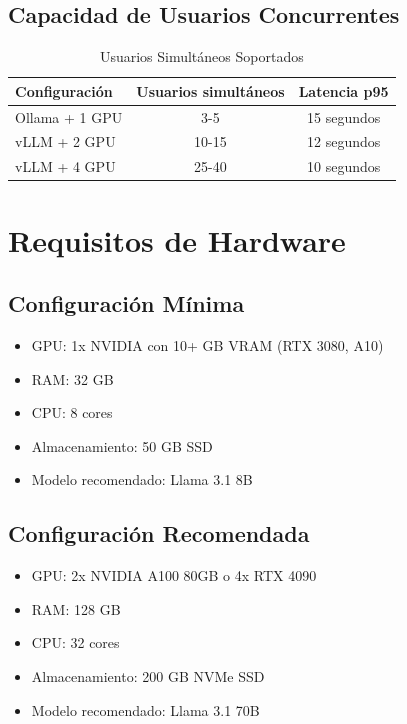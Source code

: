 \documentclass[12pt,letterpaper]{article}
\begin{document}
\subsection{Capacidad de Usuarios Concurrentes}

\begin{table}[h]
\centering
\caption{Usuarios Simult\'aneos Soportados}
\begin{tabular}{@{}lcc@{}}
\toprule
\textbf{Configuraci\'on} & \textbf{Usuarios simult\'aneos} & \textbf{Latencia p95} \\
\midrule
Ollama + 1 GPU & 3-5 & 15 segundos \\
vLLM + 2 GPU & 10-15 & 12 segundos \\
vLLM + 4 GPU & 25-40 & 10 segundos \\
\bottomrule
\end{tabular}
\end{table}

\section{Requisitos de Hardware}

\subsection{Configuraci\'on M\'inima}
\begin{itemize}
    \item GPU: 1x NVIDIA con 10+ GB VRAM (RTX 3080, A10)
    \item RAM: 32 GB
    \item CPU: 8 cores
    \item Almacenamiento: 50 GB SSD
    \item Modelo recomendado: Llama 3.1 8B
\end{itemize}

\subsection{Configuraci\'on Recomendada}
\begin{itemize}
    \item GPU: 2x NVIDIA A100 80GB o 4x RTX 4090
    \item RAM: 128 GB
    \item CPU: 32 cores
    \item Almacenamiento: 200 GB NVMe SSD
    \item Modelo recomendado: Llama 3.1 70B
\end{itemize}
\end{document}
